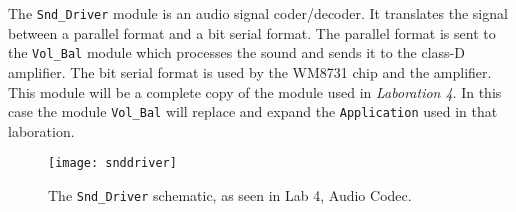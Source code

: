 The \verb?Snd_Driver? module is an audio signal coder/decoder. It translates the signal between a parallel format and a bit serial format. The parallel format is sent to the \verb?Vol_Bal? module which processes the sound and sends it to the class-D amplifier. The bit serial format is used by the WM8731 chip and the amplifier. This module will be a complete copy of the module used in \emph{Laboration 4}. In this case the module \verb?Vol_Bal? will replace and expand the \verb?Application? used in that laboration.

\begin{figure}[H]
  \centering
  \texttt{[image: snddriver]}
  \caption{The \texttt{Snd\_Driver} schematic, as seen in Lab 4, Audio Codec.}
  \label{fig:sndDriver}
\end{figure}
